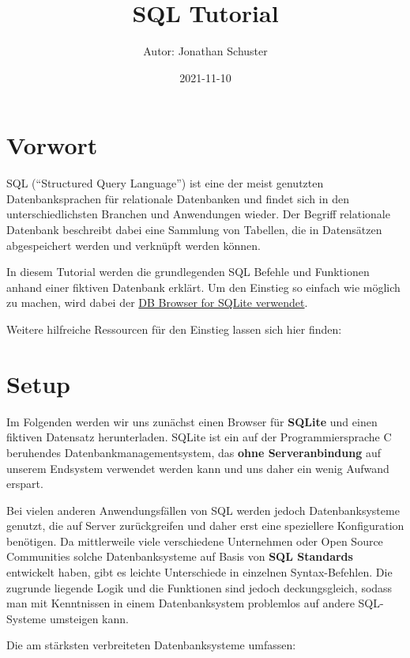 \documentclass[
]{book}
\title{SQL Tutorial}
\author{Autor: Jonathan Schuster}
\date{2021-11-10}
\begin{document}
\maketitle

{
\setcounter{tocdepth}{1}
\tableofcontents
}
\hypertarget{vorwort}{%
\chapter*{Vorwort}\label{vorwort}}

SQL (``Structured Query Language'') ist eine der meist genutzten Datenbanksprachen für relationale Datenbanken und findet sich in den unterschiedlichsten Branchen und Anwendungen wieder. Der Begriff relationale Datenbank beschreibt dabei eine Sammlung von Tabellen, die in Datensätzen abgespeichert werden und verknüpft werden können.

In diesem Tutorial werden die grundlegenden SQL Befehle und Funktionen anhand einer fiktiven Datenbank erklärt. Um den Einstieg so einfach wie möglich zu machen, wird dabei der \href{https://sqlitebrowser.org/}{DB Browser for SQLite verwendet}.

Weitere hilfreiche Ressourcen für den Einstieg lassen sich hier finden:

\hypertarget{setup}{%
\chapter{Setup}\label{setup}}

Im Folgenden werden wir uns zunächst einen Browser für \textbf{SQLite} und einen fiktiven Datensatz herunterladen. SQLite ist ein auf der Programmiersprache C beruhendes Datenbankmanagementsystem, das \textbf{ohne Serveranbindung} auf unserem Endsystem verwendet werden kann und uns daher ein wenig Aufwand erspart.

Bei vielen anderen Anwendungsfällen von SQL werden jedoch Datenbanksysteme genutzt, die auf Server zurückgreifen und daher erst eine speziellere Konfiguration benötigen. Da mittlerweile viele verschiedene Unternehmen oder Open Source Communities solche Datenbanksysteme auf Basis von \textbf{SQL Standards} entwickelt haben, gibt es leichte Unterschiede in einzelnen Syntax-Befehlen. Die zugrunde liegende Logik und die Funktionen sind jedoch deckungsgleich, sodass man mit Kenntnissen in einem Datenbanksystem problemlos auf andere SQL-Systeme umsteigen kann.

Die am stärksten verbreiteten Datenbanksysteme umfassen:
\end{document}
